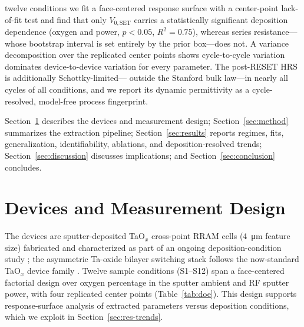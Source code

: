 \documentclass[journal]{IEEEtran}
\begin{document}
\begin{enumerate}
        twelve conditions we fit a face-centered response surface with a
        center-point lack-of-fit test and find that only $V_{0,\mathrm{SET}}$
        carries a statistically significant deposition dependence (oxygen and
        power, $p<0.05$, $R^2=0.75$), whereas series resistance---whose
        bootstrap interval is set entirely by the prior box---does not.  A
        variance decomposition over the replicated center points shows
        cycle-to-cycle variation dominates device-to-device variation for every
        parameter.  The post-RESET HRS is additionally Schottky-limited---%
        outside the Stanford bulk law---in nearly all cycles of all conditions,
        and we report its dynamic permittivity as a cycle-resolved, model-free
        process fingerprint.
\end{enumerate}

Section~\ref{sec:devices} describes the devices and measurement design;
Section~\ref{sec:method} summarizes the extraction pipeline;
Section~\ref{sec:results} reports regimes, fits, generalization,
identifiability, ablations, and deposition-resolved trends;
Section~\ref{sec:discussion} discusses implications; and
Section~\ref{sec:conclusion} concludes.

\section{Devices and Measurement Design}
\label{sec:devices}

The devices are sputter-deposited TaO$_x$ cross-point RRAM cells
(\SI{4}{\micro\meter} feature size) fabricated and characterized as part of
an ongoing deposition-condition study \cite{chowdhury2025mwscas,moazzeni2023};
the asymmetric Ta-oxide bilayer switching stack follows the now-standard
TaO$_x$ device family \cite{lee2011fast,wouters2015}.  Twelve sample
conditions (S1--S12) span a face-centered factorial design over oxygen
percentage in the sputter ambient and RF sputter power, with four replicated
center points (Table~\ref{tab:doe}).  This design supports response-surface
analysis of extracted parameters versus deposition conditions, which we
exploit in Section~\ref{sec:res-trends}.
\end{document}
